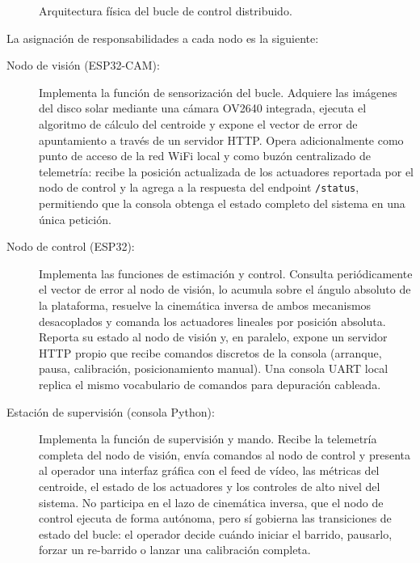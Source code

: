 \begin{figure}[htbp]
    \caption{Arquitectura física del bucle de control distribuido.}
    \label{fig:nodos_fisicos}
\end{figure}

La asignación de responsabilidades a cada nodo es la siguiente:

\begin{description}
	\item[Nodo de visión (ESP32-CAM):] Implementa la función de sensorización del bucle. Adquiere las imágenes del disco solar mediante una cámara OV2640 integrada, ejecuta el algoritmo de cálculo del centroide y expone el vector de error de apuntamiento a través de un servidor HTTP. Opera adicionalmente como punto de acceso de la red WiFi local y como buzón centralizado de telemetría: recibe la posición actualizada de los actuadores reportada por el nodo de control y la agrega a la respuesta del endpoint \texttt{/status}, permitiendo que la consola obtenga el estado completo del sistema en una única petición.

	\item[Nodo de control (ESP32):] Implementa las funciones de estimación y control. Consulta periódicamente el vector de error al nodo de visión, lo acumula sobre el ángulo absoluto de la plataforma, resuelve la cinemática inversa de ambos mecanismos desacoplados y comanda los actuadores lineales por posición absoluta. Reporta su estado al nodo de visión y, en paralelo, expone un servidor \gls{HTTP} propio que recibe comandos discretos de la consola (arranque, pausa, calibración, posicionamiento manual). Una consola \gls{UART} local replica el mismo vocabulario de comandos para depuración cableada.

	\item[Estación de supervisión (consola Python):] Implementa la función de supervisión y mando. Recibe la telemetría completa del nodo de visión, envía comandos al nodo de control y presenta al operador una interfaz gráfica con el feed de vídeo, las métricas del centroide, el estado de los actuadores y los controles de alto nivel del sistema. No participa en el lazo de cinemática inversa, que el nodo de control ejecuta de forma autónoma, pero sí gobierna las transiciones de estado del bucle: el operador decide cuándo iniciar el barrido, pausarlo, forzar un re-barrido o lanzar una calibración completa.
 
\end{description}

